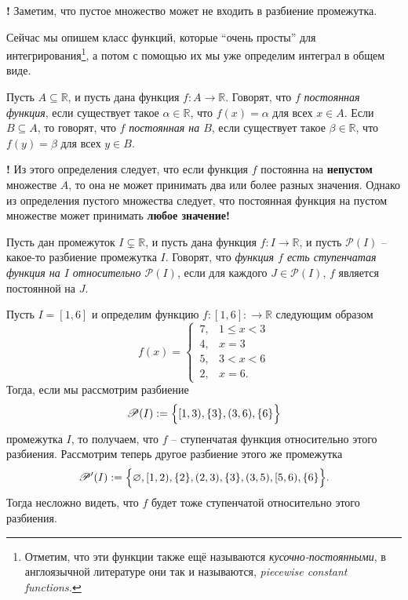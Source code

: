 \begin{mydanger}{\bf !}
    Заметим, что пустое множество может не входить в разбиение промежутка. 
\end{mydanger}





Сейчас мы опишем класс функций, которые ``очень просты'' для интегрирования\footnote{Отметим, что эти функции также ещё называются \textit{кусочно-постоянными}, в англоязычной литературе они так и называются, \textit{piecewise constant functions.}}, а потом с помощью их мы уже определим интеграл в общем виде.  

\begin{definition}
  Пусть $A \subseteq \mathbb{R}$, и пусть дана функция $f: A \to \mathbb{R}$. Говорят, что $f$ \textit{постоянная функция}, если существует такое $\alpha \in \mathbb{R}$, что $f(x) = \alpha$ для всех $x \in A$. Если $B \subseteq A$, то говорят, что $f$ \textit{постоянная на $B$}, если существует такое $\beta \in \mathbb{R}$, что $f(y) = \beta$ для всех $y \in B.$
\end{definition}


\begin{mydanger}{\bf !}
 Из этого определения следует, что если функция $f$ постоянна на \textbf{непустом} множестве $A$, то она не может принимать два или более разных значения. Однако из определения пустого множества следует, что постоянная функция на пустом множестве может принимать \textbf{любое значение!}
\end{mydanger}

\begin{definition}
    Пусть дан промежуток $I \subsetneq \mathbb{R}$, и пусть дана функция $f: I \to \mathbb{R}$, и пусть $\mathscr{P}(I)$ -- какое-то разбиение промежутка $I$. Говорят, что \textit{функция $f$ есть ступенчатая функция на $I$ относительно $\mathscr{P}(I)$}, если для каждого $J \in \mathscr{P}(I)$, $f$ является постоянной на $J$. 
\end{definition}

\begin{example}\label{int_[1,6]=10}
    Пусть $I = [1,6]$ и определим функцию $f: [1,6]: \to \mathbb{R}$ следующим образом
    \[
     f(x) = \begin{cases}
         \,7, & 1 \le x < 3 \\
         \,4, & x = 3 \\
         \,5, & 3 < x <6 \\
         \,2, & x = 6.
     \end{cases}
    \]
Тогда, если мы рассмотрим разбиение
\[
 \mathscr{P}(I) := \Bigl\{[1,3), \{3\}, (3,6), \{6\} \Bigr\}
\]
промежутка $I$, то получаем, что $f$ -- ступенчатая функция относительно этого разбиения. Рассмотрим теперь другое разбиение этого же промежутка
\[
 \mathscr{P}'(I) : = \Bigl\{\varnothing, [1,2), \{2\}, (2,3), \{3\}, (3,5), [5,6),\{6\} \Bigr\}.
\]
Тогда несложно видеть, что $f$ будет тоже ступенчатой относительно этого разбиения. 
\end{example}

